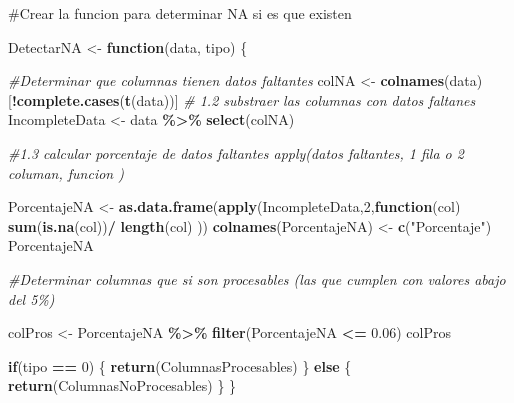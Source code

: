 \documentclass[
]{article}
\newenvironment{Shaded}{\begin{snugshade}}{\end{snugshade}}
\newcommand{\CommentTok}[1]{\textcolor[rgb]{0.56,0.35,0.01}{\textit{#1}}}
\newcommand{\ControlFlowTok}[1]{\textcolor[rgb]{0.13,0.29,0.53}{\textbf{#1}}}
\newcommand{\DecValTok}[1]{\textcolor[rgb]{0.00,0.00,0.81}{#1}}
\newcommand{\FloatTok}[1]{\textcolor[rgb]{0.00,0.00,0.81}{#1}}
\newcommand{\FunctionTok}[1]{\textcolor[rgb]{0.13,0.29,0.53}{\textbf{#1}}}
\newcommand{\NormalTok}[1]{#1}
\newcommand{\OtherTok}[1]{\textcolor[rgb]{0.56,0.35,0.01}{#1}}
\newcommand{\SpecialCharTok}[1]{\textcolor[rgb]{0.81,0.36,0.00}{\textbf{#1}}}
\newcommand{\StringTok}[1]{\textcolor[rgb]{0.31,0.60,0.02}{#1}}
\begin{document}
\#Crear la funcion para determinar NA si es que existen

\begin{Shaded}
\begin{Highlighting}[]
\NormalTok{DetectarNA }\OtherTok{\textless{}{-}}  \ControlFlowTok{function}\NormalTok{(data, tipo)}
\NormalTok{\{}
  

    \CommentTok{\#Determinar que columnas tienen datos faltantes }
\NormalTok{    colNA }\OtherTok{\textless{}{-}} \FunctionTok{colnames}\NormalTok{(data)[}\SpecialCharTok{!}\FunctionTok{complete.cases}\NormalTok{(}\FunctionTok{t}\NormalTok{(data))]}
    \CommentTok{\# 1.2 substraer las columnas con datos faltanes}
\NormalTok{    IncompleteData }\OtherTok{\textless{}{-}}\NormalTok{ data }\SpecialCharTok{\%\textgreater{}\%} 
                      \FunctionTok{select}\NormalTok{(colNA)}
    
    \CommentTok{\#1.3 calcular porcentaje de datos faltantes apply(datos faltantes, 1 fila o 2 columan,  funcion )}
    
\NormalTok{    PorcentajeNA }\OtherTok{\textless{}{-}} \FunctionTok{as.data.frame}\NormalTok{(}\FunctionTok{apply}\NormalTok{(IncompleteData,}\DecValTok{2}\NormalTok{,}\ControlFlowTok{function}\NormalTok{(col) }\FunctionTok{sum}\NormalTok{(}\FunctionTok{is.na}\NormalTok{(col))}\SpecialCharTok{/} \FunctionTok{length}\NormalTok{(col) )) }
    \FunctionTok{colnames}\NormalTok{(PorcentajeNA) }\OtherTok{\textless{}{-}} \FunctionTok{c}\NormalTok{(}\StringTok{"Porcentaje"}\NormalTok{)}
\NormalTok{    PorcentajeNA}
    
    \CommentTok{\#Determinar columnas que si son procesables (las que cumplen con valores abajo del 5\%)}
    
\NormalTok{    colPros }\OtherTok{\textless{}{-}}\NormalTok{ PorcentajeNA }\SpecialCharTok{\%\textgreater{}\%} 
                    \FunctionTok{filter}\NormalTok{(PorcentajeNA }\SpecialCharTok{\textless{}=} \FloatTok{0.06}\NormalTok{)}
\NormalTok{    colPros}
    
    \ControlFlowTok{if}\NormalTok{(tipo }\SpecialCharTok{==} \DecValTok{0}\NormalTok{)}
\NormalTok{    \{}
      \FunctionTok{return}\NormalTok{(ColumnasProcesables)}
\NormalTok{    \}}
    \ControlFlowTok{else} 
\NormalTok{    \{}
      \FunctionTok{return}\NormalTok{(ColumnasNoProcesables)}
\NormalTok{    \}}
\NormalTok{\}}


\end{Highlighting}
\end{Shaded}
\end{document}
